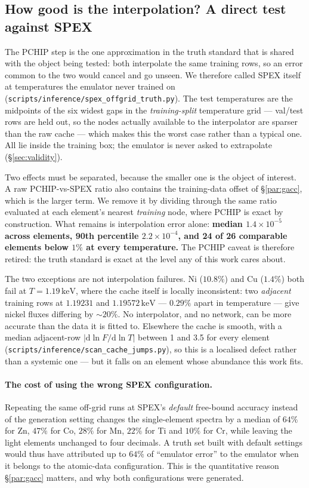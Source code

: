 \documentclass[11pt,a4paper]{article}
\newcommand{\kev}{\,\mathrm{keV}}
\newcommand{\code}[1]{\texttt{#1}}
\begin{document}
\subsection{How good is the interpolation? A direct test against
SPEX}\label{sec:pchiptest}
The PCHIP step is the one approximation in the truth standard that is shared
with the object being tested: both interpolate the same training rows, so an
error common to the two would cancel and go unseen. We therefore called SPEX
itself at temperatures the emulator never trained on
(\code{scripts/inference/spex\_offgrid\_truth.py}). The test temperatures are
the midpoints of the six widest gaps in the \emph{training-split} temperature
grid --- val/test rows are held out, so the nodes actually available to the
interpolator are sparser than the raw cache --- which makes this the worst case
rather than a typical one. All lie inside the training box; the emulator is
never asked to extrapolate (\S\ref{sec:validity}).

Two effects must be separated, because the smaller one is the object of
interest. A raw PCHIP-vs-SPEX ratio also contains the training-data offset of
\S\ref{par:gacc}, which is the larger term. We remove it by dividing through the
same ratio evaluated at each element's nearest \emph{training} node, where PCHIP
is exact by construction. What remains is interpolation error alone:
\textbf{median $1.4\times10^{-5}$ across elements, 90th percentile
$2.2\times10^{-4}$, and 24 of 26 comparable elements below $1\%$ at every
temperature.} The PCHIP caveat is therefore retired: the truth standard is
exact at the level any of this work cares about.

The two exceptions are not interpolation failures. Ni ($10.8\%$) and Cu
($1.4\%$) both fail at $T=1.19\kev$, where the cache itself is locally
inconsistent: two \emph{adjacent} training rows at $1.19231$ and $1.19572\kev$
--- $0.29\%$ apart in temperature --- give nickel fluxes differing by $\sim20\%$.
No interpolator, and no network, can be more accurate than the data it is fitted
to. Elsewhere the cache is smooth, with a median adjacent-row
$|\mathrm{d}\ln F / \mathrm{d}\ln T|$ between 1 and 3.5 for every element
(\code{scripts/inference/scan\_cache\_jumps.py}), so this is a localised defect
rather than a systemic one --- but it falls on an element whose abundance this
work fits.

\paragraph{The cost of using the wrong SPEX configuration.} Repeating the same
off-grid runs at SPEX's \emph{default} free-bound accuracy instead of the
generation setting changes the single-element spectra by a median of $64\%$ for
Zn, $47\%$ for Co, $28\%$ for Mn, $22\%$ for Ti and $10\%$ for Cr, while leaving
the light elements unchanged to four decimals. A truth set built with default
settings would thus have attributed up to $64\%$ of ``emulator error'' to the
emulator when it belongs to the atomic-data configuration. This is the
quantitative reason \S\ref{par:gacc} matters, and why both configurations were
generated.
\end{document}
